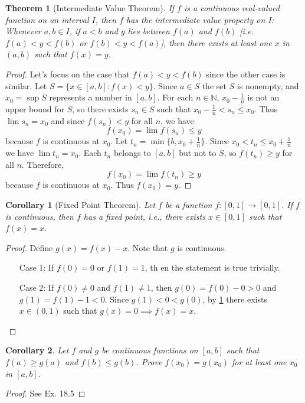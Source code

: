 \documentclass[12pt, lettersize]{book}
\theoremstyle{plain}
\newtheorem{thm}{Theorem}[section]
\newtheorem{cor}{Corollary}[thm]
\theoremstyle{definition}
\theoremstyle{remark}
\newcommand{\N}{\mathbb{N}}
\begin{document}
			\begin{thm}[Intermediate Value Theorem]\label{thm:18.2}
			If $f$ is a continuous real-valued function on an interval $I$, then $f$ has the intermediate value property on I: Whenever $a,b\in I$, if $a<b$ and $y$ lies between $f(a)$ and $f(b)$ [i.e. $f(a)<y<f(b)$ or $f(b)<y<f(a)$], then there exists at least one $x$ in
			$(a,b)$ such that $f(x)=y$.
			\end{thm}
			\begin{proof}
			Let's focus on the case that $f(a)<y<f(b)$ since the other case is similar. Let $S=\{x\in[a,b]: f(x)<y\}$. Since
			$a\in S$ the set $S$ is nonempty, and $x_0=\sup S$ represents a number in $[a,b]$. For each $n\in\N$, $x_0-\frac{1}{n}$ is not an upper bound for $S$, so there exists $s_n\in S$ such that $x_0-\frac{1}{n}<s_n\leq x_0$. Thus $\lim s_n=x_0$ and since $f(s_n)<y$ for all $n$, we have 
			\begin{displaymath}
				f(x_0)=\lim f(s_n)\leq y
			\end{displaymath} 
			because $f$ is continuous at $x_0$. Let $t_n=\min\{b, x_0+\frac{1}{n}\}$. Since $x_0<t_n\leq x_0+\frac{1}{n}$ we have $\lim t_n=x_0$. Each $t_n$ belongs to $[a,b]$ but not to $S$, so $f(t_n)\geq y$ for all $n$. Therefore,
			\begin{displaymath}
				f(x_0)=\lim f(t_n)\geq y
			\end{displaymath}
			because $f$ is continuous at $x_0$. Thus $f(x_0)=y$. 
			\end{proof}
			\begin{cor}[Fixed Point Theorem]
			Let $f$ be a function $f:[0,1]\rightarrow[0,1]$. If $f$ is continuous, then $f$ has a fixed point, i.e., there exists $x\in[0,1]$ such that $f(x)=x$.
			\end{cor}
			\begin{proof}
			Define $g(x)=f(x)-x$. Note that $g$ is continuous.
			\begin{itemize}
				\item[Case 1:] If $f(0)=0$ or $f(1)=1$, th en the statement is true trivially.
				\item[Case 2:] If $f(0)\neq0$ and $f(1)\neq1$, then $g(0)=f(0)-0>0$ and $g(1)=f(1)-1<0$. Since $g(1)<0<g(0)$, by \ref{thm:18.2} there exists $x\in(0,1)$ such that $g(x)=0\implies f(x)=x$.
			\end{itemize}
			\end{proof}
			\begin{cor}
			Let $f$ and $g$ be continuous functions on $[a,b]$ such that $f(a)\geq g(a)$ and $f(b)\leq g(b)$. Prove $f(x_0)=g(x_0)$ for at least one $x_0$ in $[a,b]$.
			\end{cor}
			\begin{proof}
				See Ex. 18.5
			\end{proof}
			
\end{document}
